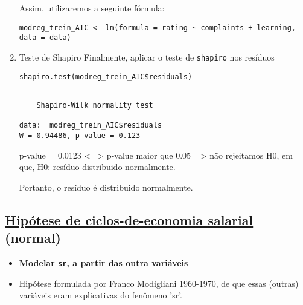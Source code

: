 \documentclass[11pt]{article}
\begin{document}
\begin{enumerate}
\begin{verbatim}
\end{verbatim}

Assim, utilizaremos a seguinte fórmula:
\begin{verbatim}
modreg_trein_AIC <- lm(formula = rating ~ complaints + learning, data = data)
\end{verbatim}

\item Teste de Shapiro
\label{sec:org831a23e}
Finalmente, aplicar o teste de \texttt{shapiro} nos resíduos

\begin{verbatim}
shapiro.test(modreg_trein_AIC$residuals)
\end{verbatim}

\begin{verbatim}

	Shapiro-Wilk normality test

data:  modreg_trein_AIC$residuals
W = 0.94486, p-value = 0.123

\end{verbatim}


p-value = 0.0123 <=> p-value maior que 0.05 => não rejeitamos H0, em que, H0: resíduo distribuido normalmente.

Portanto, o resíduo é distribuido normalmente.
\end{enumerate}

\subsection{\href{https://r-data.pmagunia.com/dataset/r-dataset-package-datasets-lifecyclesavings}{Hipótese de ciclos-de-economia salarial} (normal)}
\label{sec:org0497862}
\begin{itemize}
\item \textbf{Modelar \texttt{sr}, a partir das outra variáveis}
\item Hipótese formulada por Franco Modigliani 1960-1970, de que essas (outras)
variáveis eram explicativas do fenômeno 'sr'.
\end{itemize}
\end{document}
